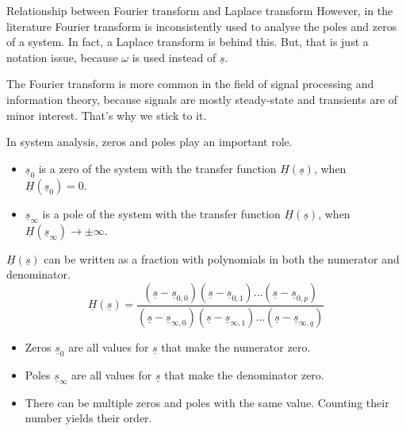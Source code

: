 \begin{refsection}
\begin{excursus}{Relationship between Fourier transform and Laplace transform}
	However, in the literature Fourier transform is inconsistently used to analyse the poles and zeros of a system. In fact, a Laplace transform is behind this. But, that is just a notation issue, because $\omega$ is used instead of $\underline{s}$.
	
	The Fourier transform is more common in the field of signal processing and information theory, because signals are mostly steady-state and transients are of minor interest. That's why we stick to it.
\end{excursus}

In system analysis, zeros and poles play an important role.
\begin{itemize}
	\item $\underline{s}_0$ is a zero of the system with the transfer function $\underline{H}(\underline{s})$, when $\underline{H}(\underline{s}_0) = 0$.
	\item $\underline{s}_\infty$ is a pole of the system with the transfer function $\underline{H}(\underline{s})$, when $\underline{H}(\underline{s}_\infty) \rightarrow \pm \infty$.
\end{itemize}

$\underline{H}(\underline{s})$ can be written as a fraction with polynomials in both the numerator and denominator.
\begin{equation}
	\underline{H}(\underline{s}) = \frac{(\underline{s} - \underline{s}_{0,0}) (\underline{s} - \underline{s}_{0,1}) \ldots  (\underline{s} - \underline{s}_{0,p})}{(\underline{s} - \underline{s}_{\infty,0}) (\underline{s} - \underline{s}_{\infty,1}) \ldots (\underline{s} - \underline{s}_{\infty,q})}
\end{equation}
\begin{itemize}
	\item Zeros $\underline{s}_0$ are all values for $\underline{s}$ that make the numerator zero.
	\item Poles $\underline{s}_\infty$ are all values for $\underline{s}$ that make the denominator zero.
	\item There can be multiple zeros and poles with the same value. Counting their number yields their order.
\end{itemize}


\end{refsection}
